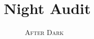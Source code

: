 \documentclass[12pt, a4paper, twoside, english] {article}
\title{Night Audit}
\author{%
\Large\textsc{After Dark} ~\\[0ex]
}%
\begin{document}
%
\pagecolor{yellow!1!orange!3!}%
\maketitle%
\thispagestyle{fancytitle}%
\begin{onehalfspacing}%
%

% 

\printbibliography
\end{onehalfspacing}%
\end{document}
